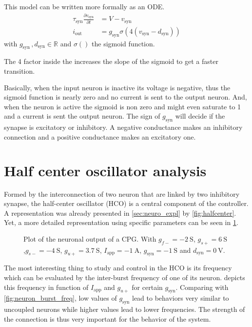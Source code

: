This model can be written more formally as an ODE.
\begin{align}
    \tau_\text{syn}\frac{\partial v_\text{syn}}{\partial t} &= V - v_\text{syn}\label{eq:syn_start}\\
    i_\text{out} &= g_\text{syn}\sigma\left(4\left(v_\text{syn} - d_\text{syn}\right)\right)\label{eq:syn_end}   
\end{align}
with $g_\text{syn}\,, d_\text{syn} \in \mathbb{R}$ and $\sigma\left(\right)$ the sigmoid function.

The 4 factor inside the increases the slope of the sigmoid to get a faster transition.

Basically, when the input neuron is inactive its voltage is negative, thus the sigmoid function is nearly zero and no current is sent to the output neuron. And, when the neuron is active the sigmoid is non zero and might even saturate to 1 and a current is sent the output neuron. The sign of $g_\text{syn}$ will  decide if the synapse is excitatory or inhibitory. A negative conductance makes an inhibitory connection and a positive conductance makes an excitatory one.

\section{Half center oscillator  analysis}

Formed by the interconnection of two neuron that are linked by two inhibitory synapse, the half-center oscillator (HCO) is a central component of the controller. A representation was already presented in \cref{sec:neuro_expl} by \cref{fig:halfcenter}. Yet, a more detailed representation using specific parameters can be seen in \cref{fig:cpg_time}.

\begin{figure}[!htb] %
    \centering
    \caption{Plot of the neuronal output of a CPG. With $g_{f-}=\qty{-2}{\siemens}$, $g_{s+}=\qty{6}{\siemens}$ ,$g_{s-}=\qty{-4}{\siemens}$, $g_{u+} = \qty{3.7}{\siemens}$, $I_\text{app} = \qty{-1}{\ampere}$, $g_\text{syn} = \qty{-1}{\siemens}$ and $d_\text{syn} = \qty{0}{\volt}$.}
    \label{fig:cpg_time}
\end{figure}

The most interesting thing to study and control in the HCO is its frequency which can be evaluated by the inter-burst frequency of one of its neuron.  depicts this frequency in function of $I_\text{app}$ and $g_{u+}$ for certain $g_\text{syn}$. Comparing with \cref{fig:neuron_burst_freq}, low values of $g_\text{syn}$ lead to behaviors very similar to uncoupled neurons while higher values lead to lower frequencies. The strength of the connection is thus very important for the behavior of the system.

